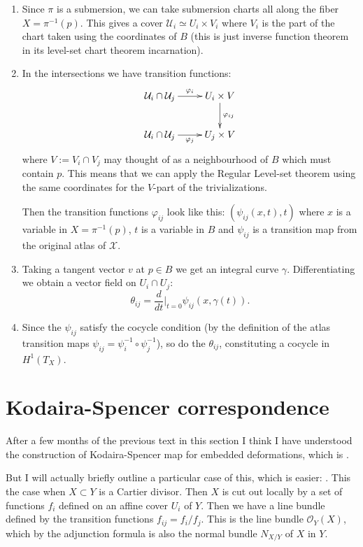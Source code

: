 \begin{enumerate}
\item Since $\pi$ is a submersion,
we can take submersion charts all along
the fiber $X = \pi^{-1}(p)$. This gives
a cover $\mathcal{U}_i\simeq U_i \times V_i$ 
where
$V_i$ is the part of the chart taken
using the coordinates of $B$
(this is just inverse function
theorem in its level-set chart theorem
incarnation).

\item In the intersections we have
transition functions:
$$
\xymatrix{
\mathcal{U}_i \cap \mathcal{U}_j
\ar[r]^{\varphi_i}& 
U_i \times V \ar[d]^{\varphi_{ij}}\\
\mathcal{U}_i \cap\mathcal{U}_j
\ar[r]_{\varphi_j}&
U_j \times V
}
$$
where $V:= V_i \cap V_j$ may thought
of as a neighbourhood of $B$
which must contain $p$.
This means that we can apply the
Regular Level-set theorem using the
same coordinates for the $V$-part
of the trivializations.

Then the transition functions
$\varphi_{ij}$ look like this:
$(\psi_{ij}(x,t),t)$ 
where $x$ is a variable
in $X = \pi^{-1}(p)$, 
$t$ is a variable in $B$
and $\psi_{ij}$ is a transition map from the
original atlas of $\mathcal{X}$.

\item Taking a tangent vector $v$ 
at $p \in B$ we get an 
integral curve $\gamma$.
Differentiating we obtain a vector field
on $U_i \cap U_j$:
$$
\theta_{ij}=\frac{d}{dt}\Big|_{t=0}
\psi_{ij}(x,\gamma(t)).
$$
\item Since the $\psi_{ij}$
satisfy the cocycle condition
(by the definition of the atlas
transition maps 
$\psi_{ij}=\psi_i^{-1}\circ \psi_j^{-1}$),
so do the $\theta_{ij}$, constituting
a cocycle in $H^1(T_X)$.
\end{enumerate}


\section{Kodaira-Spencer correspondence}
\label{section-kodaia-spencer-correspondence}


\medskip\noindent
After a few months of the previous text in
this section
I think I have understood the construction of
Kodaira-Spencer map for embedded
deformations,
which is \cite[Proposition
3.2.1(ii)]{Sernesi-deformations}.

But I will actually briefly outline a
particular case
of this, which is easier: \cite[Examples
3.2.4(ii)]{Sernesi-deformations}.
This the case when $X \subset Y$ is a Cartier
divisor.
Then $X$ is cut out locally by a set of
functions $f_i$
defined on an affine cover $U_i$ of $Y$.
Then we have a line bundle defined by the
transition functions $f_{ij}=f_i/f_j$.
This is the line bundle $\mathcal{O}_Y(X)$,
which
by the adjunction formula is also the normal
bundle $N_{X/Y}$
of $X$ in $Y$.

